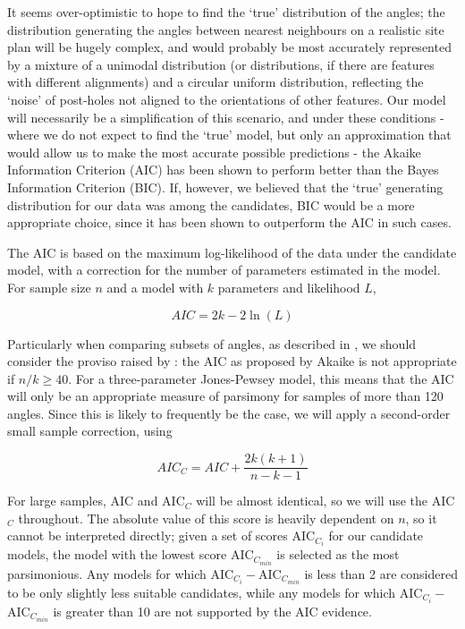 \documentclass[../../ArchStats.tex]{subfiles}
\begin{document}
It seems over-optimistic to hope to find the `true' distribution of the angles; the distribution generating the angles between nearest neighbours on a realistic site plan will be hugely complex, and would probably be most accurately represented by a mixture of a unimodal distribution (or distributions, if there are features with different alignments) and a circular uniform distribution, reflecting the `noise'  of post-holes not aligned to the orientations of other features. Our model will necessarily be a simplification of this scenario, and under these conditions - where we do not expect to find the `true' model, but only an approximation that would allow us to make the most accurate possible predictions - the Akaike Information Criterion (AIC) has been shown to perform better than the Bayes Information Criterion (BIC)\cite{aho2014}. If, however, we believed that the `true' generating distribution for our data was among the candidates, BIC would be a more appropriate choice, since it has been shown to outperform the AIC in such cases. 

The AIC is based on the maximum log-likelihood of the data under the candidate model, with a correction for the number of parameters estimated in the model\cite{Akaike1974}. For sample size $n$ and a model with $k$ parameters and likelihood $L$, 

\[AIC = 2k - 2 \ln (L)\]

Particularly when comparing subsets of angles, as described in , we should consider the proviso raised by \cite{Burnham2004}: the AIC as proposed by Akaike  is not appropriate if $n/k \geq 40$. For a three-parameter Jones-Pewsey model, this means that the AIC will only be an appropriate measure of parsimony for samples of more than 120 angles. Since this is likely to frequently be the case, we will apply a second-order small sample correction, using

\[AIC_C = AIC + \frac{2k(k+1)}{n-k-1} \]

For large samples, AIC and AIC$_C$ will be almost identical, so we will use the AIC$_C$ throughout. The absolute value of this score is heavily dependent on $n$, so it cannot be interpreted directly; given a set of scores AIC$_{C_i}$ for our candidate models, the model with the lowest score AIC$_{C_{min}}$ is selected as the most parsimonious. Any models for which AIC$_{C_i} - $AIC$_{C_{min}}$ is less than 2 are considered to be only slightly less suitable candidates, while any models for which AIC$_{C_i} - $AIC$_{C_{min}}$ is greater than 10 are not supported by the AIC evidence.
\end{document}
